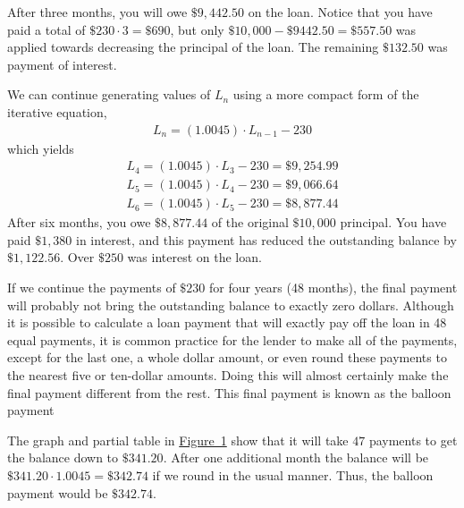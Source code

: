 \documentclass[10pt,]{book}
\theoremstyle{plain}
\theoremstyle{definition}
\theoremstyle{definition}
\theoremstyle{definition}
\numberwithin{equation}{section}
\begin{document}
\hypertarget{p-35}{}%
After three months, you will owe \(\$9,442.50\) on the loan. Notice that you have paid a total of \(\$230\cdot 3=\$690\), but only \(\$10,000-\$9442.50=\$557.50\) was applied towards decreasing the principal of the loan. The remaining \(\$132.50\) was payment of interest.%
\par
\hypertarget{p-36}{}%
We can continue generating values of \(L_n\) using a more compact form of the iterative equation,%
%
\begin{gather*}
L_n=(1.0045)\cdot L_{n-1}-230
\end{gather*}
\hypertarget{p-37}{}%
which yields%
%
\begin{gather*}
L_4=(1.0045)\cdot L_3-230=\$9,254.99\\
L_5=(1.0045)\cdot L_4-230=\$9,066.64\\
L_6=(1.0045)\cdot L_5-230=\$8,877.44
\end{gather*}
\hypertarget{p-38}{}%
After six months, you owe \(\$8,877.44\) of the original \(\$10,000\) principal.  You have paid \(\$1,380\) in interest, and this payment has reduced the outstanding balance by \(\$1,122.56\).  Over \(\$250\) was interest on the loan.%
\par
\hypertarget{p-39}{}%
If we continue the payments of \(\$230\) for four years (48 months), the final payment will probably not bring the outstanding balance to exactly zero dollars.  Although it is possible to calculate a loan payment that will exactly pay off the loan in 48 equal payments, it is common practice for the lender to make all of the payments, except for the last one, a whole dollar amount, or even round these payments to the nearest five or ten-dollar amounts. Doing this will almost certainly make the final payment different from the rest.  This final payment is known as the balloon payment%
\par
\hypertarget{p-40}{}%
The graph and partial table in \hyperref[loan-balance]{Figure~1} show that it will take \(47\) payments to get the balance down to \(\$341.20\).  After one additional month the balance will be \(\$341.20\cdot 1.0045=\$342.74\) if we round in the usual manner.  Thus, the balloon payment would be \(\$342.74\).%
\end{document}

